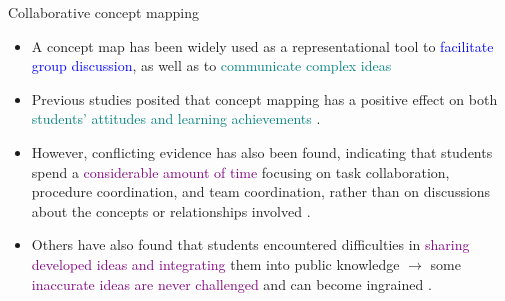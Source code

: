 \begin{frame}{Collaborative concept mapping}  
    \begin{itemize}
        \item<1-2> A concept map has been widely used as a representational tool to \textcolor{blue}{facilitate group discussion}, as well as to \textcolor{teal}{communicate complex ideas} \cite{Fischer2002FosteringTools,Gracia-Moreno2017CollaborativeWorkspaces,Suthers2006TechnologyCSCL,vanBoxtel2000CollaborativeKnowledge}

        \item<2> Previous studies posited that concept mapping has a positive effect on both \textcolor{teal}{students’ attitudes and learning achievements} \cite{Basque2006CollaborativeTrends,Czerniak1998TheScience}.
        
        \item<3-> However, conflicting evidence has also been found, indicating that students spend a \textcolor{purple}{considerable amount of time} focusing on task collaboration, procedure coordination, and team coordination, rather than on discussions about the concepts or relationships involved \cite{chiu2003exploring}. 
        
        \item<4> Others have also found that students encountered difficulties in \textcolor{purple}{sharing developed ideas and integrating} them into public knowledge \cite{Gracia-Moreno2017CollaborativeWorkspaces,vanBoxtel2000CollaborativeKnowledge} $\longrightarrow$ some \textcolor{purple}{inaccurate ideas are never challenged} and can become ingrained \cite{roth1992social}.
    \end{itemize}
\end{frame}


